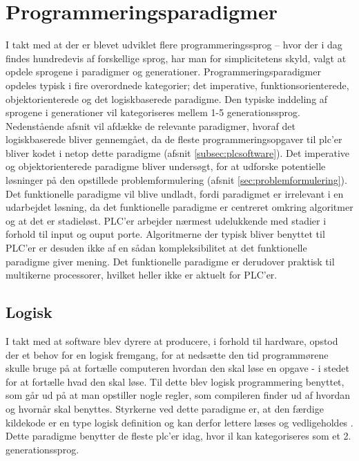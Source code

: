 \section{Programmeringsparadigmer}\label{sec:paradigmer}\label{ssec:hovedparadigmer}

I takt med at der er blevet udviklet flere programmeringssprog – hvor der i dag findes hundredevis af forskellige sprog, har man for simplicitetens skyld, valgt at opdele sprogene i paradigmer og generationer. Programmeringsparadigmer opdeles typisk i fire overordnede kategorier; det imperative, funktionsorienterede, objektorienterede og det logiskbaserede paradigme. Den typiske inddeling af sprogene i generationer vil kategoriseres mellem 1-5 generationssprog. Nedenstående afsnit vil afdække de relevante paradigmer, hvoraf det logiskbaserede bliver gennemgået, da de fleste programmeringsopgaver til \gls{plc}'er bliver kodet i netop dette paradigme (afsnit \ref{subsec:plcsoftware}). Det imperative og objektorienterede paradigme bliver undersøgt, for at udforske potentielle løsninger på den opstillede problemformulering (afsnit \ref{sec:problemformulering}). Det funktionelle paradigme vil blive undladt, fordi paradigmet er irrelevant i en udarbejdet løsning, da det funktionelle paradigme er centreret omkring algoritmer og at det er stadieløst. PLC'er arbejder nærmest udelukkende med stadier i forhold til input og ouput porte. Algoritmerne der typisk bliver benyttet til PLC'er er desuden ikke af en sådan kompleksibilitet at det funktionelle paradigme giver mening. Det funktionelle paradigme er derudover praktisk til multikerne processorer, hvilket heller ikke er aktuelt for PLC'er. \cite{functprog}

\tocless \subsection{Logisk}
I takt med at software blev dyrere at producere, i forhold til hardware, opstod der et behov for en logisk fremgang, for at nedsætte den tid programmørene skulle bruge på at fortælle computeren hvordan den skal løse en opgave - i stedet for at fortælle hvad den skal løse. Til dette blev logisk programmering benyttet, som går ud på at man opstiller nogle regler, som compileren finder ud af hvordan og hvornår skal benyttes. Styrkerne ved dette paradigme er, at den færdige kildekode er en type logisk definition og kan derfor lettere læses og vedligeholdes \cite{Sebesta_2013}. Dette paradigme benytter de fleste \gls{plc}'er idag, hvor \gls{il} kan kategoriseres som et 2. generationssprog.


